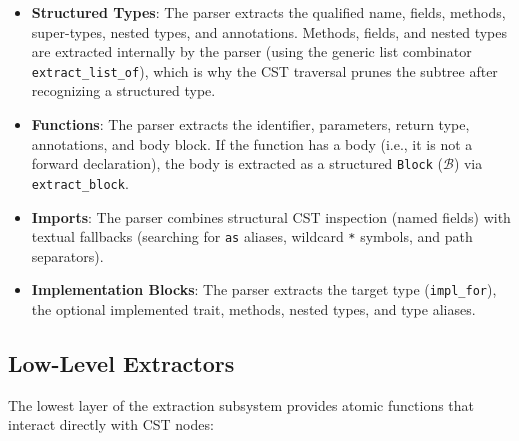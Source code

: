 \begin{itemize}
  \item \textbf{Structured Types}: The parser extracts the qualified name, fields, methods, super-types, nested types, and annotations. Methods, fields, and nested types are extracted internally by the parser (using the generic list combinator \texttt{extract\_list\_of}), which is why the CST traversal prunes the subtree after recognizing a structured type.
  \item \textbf{Functions}: The parser extracts the identifier, parameters, return type, annotations, and body block. If the function has a body (i.e., it is not a forward declaration), the body is extracted as a structured \texttt{Block} ($\mathcal{B}$) via \texttt{extract\_block}.
  \item \textbf{Imports}: The parser combines structural CST inspection (named fields) with textual fallbacks (searching for \texttt{as} aliases, wildcard \texttt{*} symbols, and path separators).
  \item \textbf{Implementation Blocks}: The parser extracts the target type (\texttt{impl\_for}), the optional implemented trait, methods, nested types, and type aliases.
\end{itemize}

\subsection{Low-Level Extractors}

The lowest layer of the extraction subsystem provides atomic functions that interact directly with CST nodes:

